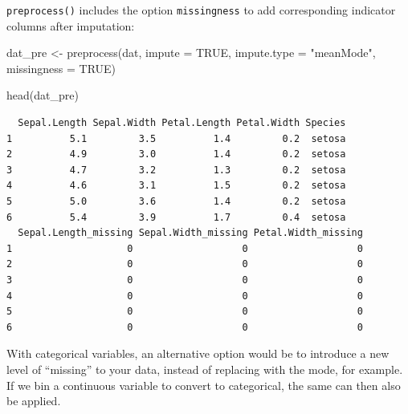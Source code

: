 \documentclass[
]{book}
\newenvironment{Shaded}{\begin{snugshade}}{\end{snugshade}}
\newcommand{\AttributeTok}[1]{\textcolor[rgb]{0.77,0.63,0.00}{#1}}
\newcommand{\ConstantTok}[1]{\textcolor[rgb]{0.00,0.00,0.00}{#1}}
\newcommand{\FunctionTok}[1]{\textcolor[rgb]{0.00,0.00,0.00}{#1}}
\newcommand{\NormalTok}[1]{#1}
\newcommand{\OtherTok}[1]{\textcolor[rgb]{0.56,0.35,0.01}{#1}}
\newcommand{\SpecialCharTok}[1]{\textcolor[rgb]{0.00,0.00,0.00}{#1}}
\newcommand{\StringTok}[1]{\textcolor[rgb]{0.31,0.60,0.02}{#1}}
\begin{document}
\begin{Shaded}
\end{Shaded}

\texttt{preprocess()} includes the option \texttt{missingness} to add corresponding indicator columns after imputation:

\begin{Shaded}
\begin{Highlighting}[]
\NormalTok{dat\_pre }\OtherTok{\textless{}{-}} \FunctionTok{preprocess}\NormalTok{(dat, }\AttributeTok{impute =} \ConstantTok{TRUE}\NormalTok{, }\AttributeTok{impute.type =} \StringTok{"meanMode"}\NormalTok{,}
                      \AttributeTok{missingness =} \ConstantTok{TRUE}\NormalTok{)}
\end{Highlighting}
\end{Shaded}

\begin{Shaded}
\begin{Highlighting}[]
\FunctionTok{head}\NormalTok{(dat\_pre)}
\end{Highlighting}
\end{Shaded}

\begin{verbatim}
  Sepal.Length Sepal.Width Petal.Length Petal.Width Species
1          5.1         3.5          1.4         0.2  setosa
2          4.9         3.0          1.4         0.2  setosa
3          4.7         3.2          1.3         0.2  setosa
4          4.6         3.1          1.5         0.2  setosa
5          5.0         3.6          1.4         0.2  setosa
6          5.4         3.9          1.7         0.4  setosa
  Sepal.Length_missing Sepal.Width_missing Petal.Width_missing
1                    0                   0                   0
2                    0                   0                   0
3                    0                   0                   0
4                    0                   0                   0
5                    0                   0                   0
6                    0                   0                   0
\end{verbatim}

With categorical variables, an alternative option would be to introduce a new level of ``missing'' to your data, instead of replacing with the mode, for example. If we bin a continuous variable to convert to categorical, the same can then also be applied.
\end{document}
